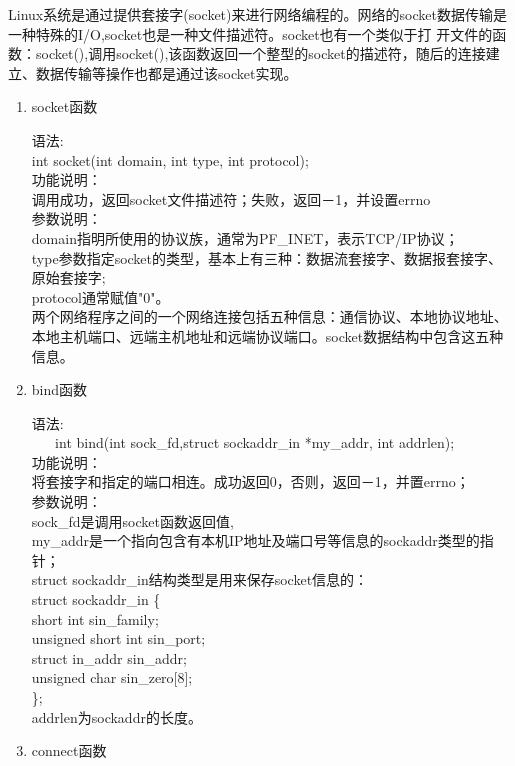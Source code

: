\documentclass[utf8]{book}
\begin{document}
	Linux系统是通过提供套接字(socket)来进行网络编程的。网络的socket数据传输是一种特殊的I/O,socket也是一种文件描述符。socket也有一个类似于打
	开文件的函数：socket(),调用socket(),该函数返回一个整型的socket的描述符，随后的连接建立、数据传输等操作也都是通过该socket实现。
	\begin{enumerate}
		\item socket函数
		
		语法:\\
		int socket(int domain, int type, int protocol);\\
		功能说明：\\
		调用成功，返回socket文件描述符；失败，返回－1，并设置errno\\
		参数说明：\\
		domain指明所使用的协议族，通常为PF\_INET，表示TCP/IP协议；\\
		type参数指定socket的类型，基本上有三种：数据流套接字、数据报套接字、原始套接字;\\
		protocol通常赋值"0"。\\
		两个网络程序之间的一个网络连接包括五种信息：通信协议、本地协议地址、本地主机端口、远端主机地址和远端协议端口。socket数据结构中包含这五种信息。
		
		\item bind函数
		
		语法:\\ 
		 
		int bind(int sock\_fd,struct sockaddr\_in *my\_addr, int addrlen);\\
		功能说明：\\
		将套接字和指定的端口相连。成功返回0，否则，返回－1，并置errno；\\
		参数说明：\\
		sock\_fd是调用socket函数返回值,\\
		my\_addr是一个指向包含有本机IP地址及端口号等信息的sockaddr类型的指针；\\
		struct sockaddr\_in结构类型是用来保存socket信息的：\\
		struct sockaddr\_in \{\\
			short int sin\_family;\\
			unsigned short int sin\_port;\\
			struct in\_addr sin\_addr;\\
			unsigned char sin\_zero[8];\\
		\};\\
		addrlen为sockaddr的长度。\\
		
		\item connect函数
		

\end{enumerate}
\end{document}
